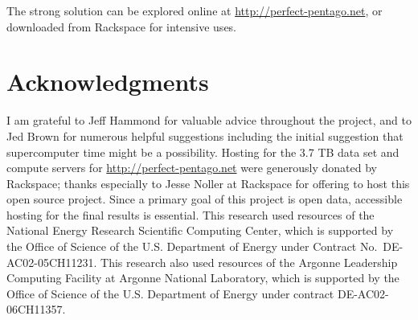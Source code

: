 \documentclass[conference]{IEEEtran}
\begin{document}
The strong solution can be explored online at \url{http://perfect-pentago.net}, or downloaded from Rackspace
for intensive uses.

\section*{Acknowledgments}

I am grateful to Jeff Hammond for valuable advice throughout the project, and to Jed Brown for numerous helpful
suggestions including the initial suggestion that supercomputer time might be a possibility.
Hosting for the 3.7 TB data set and compute servers for \url{http://perfect-pentago.net} were generously donated
by Rackspace; thanks especially to Jesse Noller at Rackspace for offering to host this open source project.
Since a primary goal of this project is open data, accessible hosting for the final results is essential.
This research used resources of the National Energy Research Scientific Computing Center, which is supported by
the Office of Science of the U.S. Department of Energy under Contract No.\ DE-AC02-05CH11231.  This research also
used resources of the Argonne Leadership Computing Facility at Argonne National Laboratory, which is supported by
the Office of Science of the U.S. Department of Energy under contract DE-AC02-06CH11357.



\end{document}

